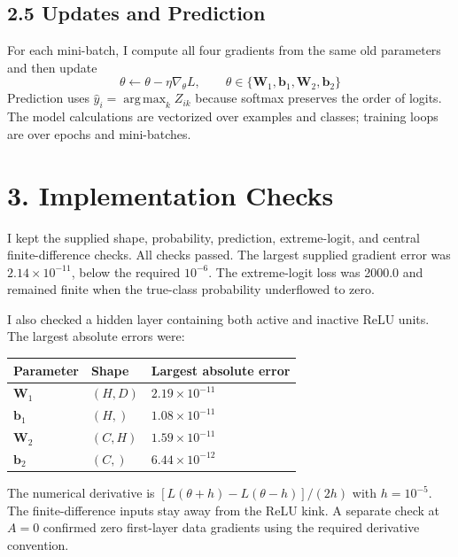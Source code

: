 \documentclass[a4paper,12pt]{article}
\begin{document}
\subsection*{2.5 Updates and Prediction}

For each mini-batch, I compute all four gradients from the same old parameters and then update \[
\theta\leftarrow\theta-\eta\nabla_\theta L,
\qquad\theta\in\{\boldsymbol{W}_1,\boldsymbol{b}_1,\boldsymbol{W}_2,\boldsymbol{b}_2\}
\] Prediction uses \(\hat y_i=\operatorname*{arg\,max}_kZ_{ik}\) because softmax preserves the order of logits. The model calculations are vectorized over examples and classes; training loops are over epochs and mini-batches.

\section*{3. Implementation Checks}

I kept the supplied shape, probability, prediction, extreme-logit, and central finite-difference checks. All checks passed. The largest supplied gradient error was \(2.14\times10^{-11}\), below the required \(10^{-6}\). The extreme-logit loss was 2000.0 and remained finite when the true-class probability underflowed to zero.

I also checked a hidden layer containing both active and inactive ReLU units. The largest absolute errors were:

\begin{center}
\begingroup
\normalsize
\setlength{\tabcolsep}{4pt}
\renewcommand{\arraystretch}{1.16}
\begin{tabularx}{\linewidth}{@{}>{\raggedright\arraybackslash}X>{\centering\arraybackslash}X>{\centering\arraybackslash}X@{}}
\toprule
\textbf{Parameter} & \textbf{Shape} & \textbf{Largest absolute error} \\
\midrule
\(\boldsymbol{W}_1\) & \((H,D)\) & \(2.19\times10^{-11}\) \\
\(\boldsymbol{b}_1\) & \((H,)\) & \(1.08\times10^{-11}\) \\
\(\boldsymbol{W}_2\) & \((C,H)\) & \(1.59\times10^{-11}\) \\
\(\boldsymbol{b}_2\) & \((C,)\) & \(6.44\times10^{-12}\) \\
\bottomrule
\end{tabularx}
\endgroup
\end{center}

The numerical derivative is \([L(\theta+h)-L(\theta-h)]/(2h)\) with \(h=10^{-5}\). The finite-difference inputs stay away from the ReLU kink. A separate check at \(A=0\) confirmed zero first-layer data gradients using the required derivative convention.
\end{document}

